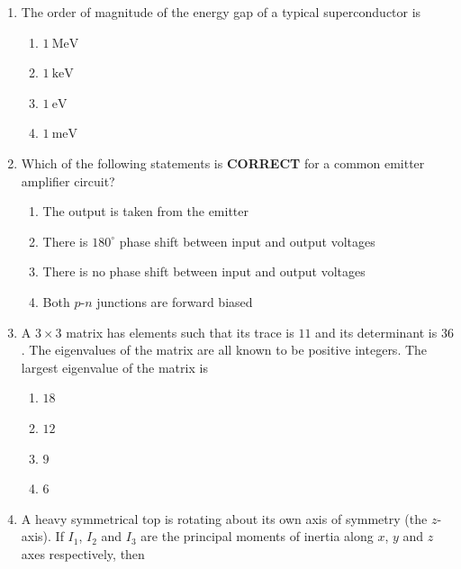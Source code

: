 \documentclass[journal,12pt,onecolumn]{IEEEtran}
\begin{document}
\begin{enumerate}
\item The order of magnitude of the energy gap of a typical superconductor is

\hfill{}

\begin{multicols}{2}
\begin{enumerate}
    \item $1 \ \mathrm{MeV}$
    \item $1 \ \mathrm{keV}$
    \item $1 \ \mathrm{eV}$
    \item $1 \ \mathrm{meV}$
\end{enumerate}
\end{multicols}

\item Which of the following statements is \textbf{CORRECT} for a common emitter amplifier circuit?

\hfill{}


\begin{enumerate}
    \item The output is taken from the emitter
    \item There is $180^\circ$ phase shift between input and output voltages
    \item There is no phase shift between input and output voltages
    \item Both $p$-$n$ junctions are forward biased
\end{enumerate}


\item A $3 \times 3$ matrix has elements such that its trace is $11$ and its determinant is $36$. The eigenvalues of the matrix are all known to be positive integers. The largest eigenvalue of the matrix is

\hfill{}

\begin{multicols}{4}
\begin{enumerate}
    \item $18$
    \item $12$
    \item $9$
    \item $6$
\end{enumerate}
\end{multicols}

\item A heavy symmetrical top is rotating about its own axis of symmetry (the $z$-axis). If $I_{1}$, $I_{2}$ and $I_{3}$ are the principal moments of inertia along $x$, $y$ and $z$ axes respectively, then


\end{enumerate}
\end{document}
